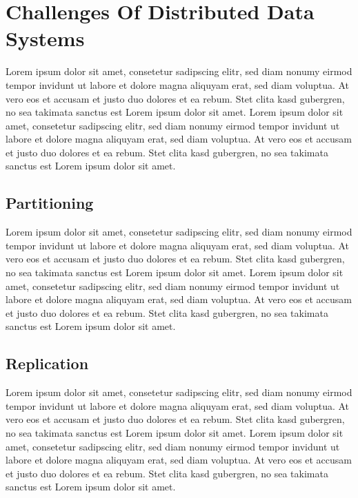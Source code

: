 {\section{Challenges Of Distributed Data Systems}
\label{tf_dds}
Lorem ipsum dolor sit amet, consetetur sadipscing elitr, sed diam nonumy eirmod tempor invidunt ut labore et dolore magna aliquyam erat, sed diam voluptua. At vero eos et accusam et justo duo dolores et ea rebum. Stet clita kasd gubergren, no sea takimata sanctus est Lorem ipsum dolor sit amet. Lorem ipsum dolor sit amet, consetetur sadipscing elitr, sed diam nonumy eirmod tempor invidunt ut labore et dolore magna aliquyam erat, sed diam voluptua. At vero eos et accusam et justo duo dolores et ea rebum. Stet clita kasd gubergren, no sea takimata sanctus est Lorem ipsum dolor sit amet.

	\subsection{Partitioning}
	\label{tf_dds_partitioning}
	Lorem ipsum dolor sit amet, consetetur sadipscing elitr, sed diam nonumy eirmod tempor invidunt ut labore et dolore magna aliquyam erat, sed diam voluptua. At vero eos et accusam et justo duo dolores et ea rebum. Stet clita kasd gubergren, no sea takimata sanctus est Lorem ipsum dolor sit amet. Lorem ipsum dolor sit amet, consetetur sadipscing elitr, sed diam nonumy eirmod tempor invidunt ut labore et dolore magna aliquyam erat, sed diam voluptua. At vero eos et accusam et justo duo dolores et ea rebum. Stet clita kasd gubergren, no sea takimata sanctus est Lorem ipsum dolor sit amet.

	\subsection{Replication}
	\label{tf_dds_replication}
	Lorem ipsum dolor sit amet, consetetur sadipscing elitr, sed diam nonumy eirmod tempor invidunt ut labore et dolore magna aliquyam erat, sed diam voluptua. At vero eos et accusam et justo duo dolores et ea rebum. Stet clita kasd gubergren, no sea takimata sanctus est Lorem ipsum dolor sit amet. Lorem ipsum dolor sit amet, consetetur sadipscing elitr, sed diam nonumy eirmod tempor invidunt ut labore et dolore magna aliquyam erat, sed diam voluptua. At vero eos et accusam et justo duo dolores et ea rebum. Stet clita kasd gubergren, no sea takimata sanctus est Lorem ipsum dolor sit amet.

}
